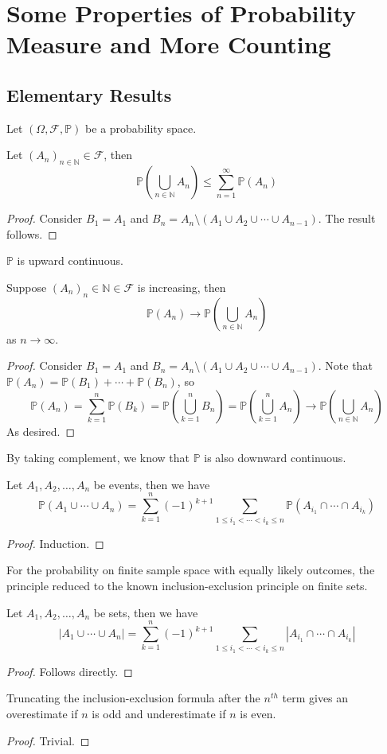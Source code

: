 \section{Some Properties of Probability Measure and More Counting}
\subsection{Elementary Results}
Let $(\Omega,\mathscr F,\mathbb P)$ be a probability space.
\begin{proposition}
    Let $(A_n)_{n\in\mathbb N}\in\mathscr F$, then
    $$\mathbb P\left( \bigcup_{n\in\mathbb N}A_n \right)\le\sum_{n=1}^\infty \mathbb P(A_n)$$
\end{proposition}
\begin{proof}
    Consider $B_1=A_1$ and $B_n=A_n\setminus (A_1\cup A_2\cup\cdots\cup A_{n-1})$.
    The result follows.
\end{proof}
$\mathbb P$ is upward continuous.
\begin{proposition}
    Suppose $(A_n)_n\in\mathbb N\in\mathscr F$ is increasing, then
    $$\mathbb P(A_n)\to \mathbb P\left( \bigcup_{n\in\mathbb N} A_n\right)$$
    as $n\to\infty$.
\end{proposition}
\begin{proof}
    Consider $B_1=A_1$ and $B_n=A_n\setminus (A_1\cup A_2\cup\cdots\cup A_{n-1})$.
    Note that $\mathbb P(A_n)=\mathbb P(B_1)+\cdots+\mathbb P(B_n)$, so
    $$\mathbb P(A_n)=\sum_{k=1}^n\mathbb P(B_k)=\mathbb P\left(\bigcup_{k=1}^nB_n\right)=\mathbb P\left( \bigcup_{k=1}^nA_n \right)\to\mathbb P\left( \bigcup_{n\in\mathbb N} A_n\right)$$
    As desired.
\end{proof}
By taking complement, we know that $\mathbb P$ is also downward continuous.
\begin{proposition}
    Let $A_1,A_2,\ldots,A_n$ be events, then we have
    $$\mathbb P(A_1\cup\cdots\cup A_n)=\sum_{k=1}^n(-1)^{k+1}\sum_{1\le i_1<\cdots<i_k\le n}\mathbb P(A_{i_1}\cap\cdots\cap A_{i_k})$$
\end{proposition}
\begin{proof}
    Induction.
\end{proof}
For the probability on finite sample space with equally likely outcomes, the principle reduced to the known inclusion-exclusion principle on finite sets.
\begin{corollary}
    Let $A_1,A_2,\ldots,A_n$ be sets, then we have
    $$|A_1\cup\cdots\cup A_n|=\sum_{k=1}^n(-1)^{k+1}\sum_{1\le i_1<\cdots<i_k\le n}|A_{i_1}\cap\cdots\cap A_{i_k}|$$
\end{corollary}
\begin{proof}
    Follows directly.
\end{proof}
\begin{proposition}
    Truncating the inclusion-exclusion formula after the $n^{th}$ term gives an overestimate if $n$ is odd and underestimate if $n$ is even.
\end{proposition}
\begin{proof}
    Trivial.
\end{proof}
